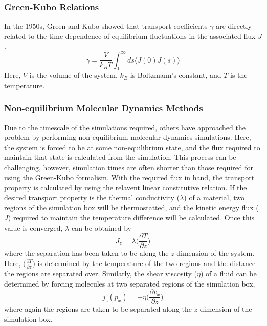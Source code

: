 \subsubsection{Green-Kubo Relations}
In the 1950s, Green and Kubo showed that transport coefficients
$\gamma$ are directly related to the time dependence of equilibrium
fluctuations in the associated flux $J$.
\begin{equation}\label{eq:greenKubo}
\gamma = \frac{V}{k_BT}\int_0^{\infty}ds\langle J(0)J(s)\rangle
\end{equation}
Here, $V$ is the volume of the system, $k_B$ is Boltzmann's constant,
and $T$ is the temperature.

\subsubsection{Non-equilibrium Molecular Dynamics Methods}
Due to the timescale of the simulations required, others have
approached the problem by performing non-equilibrium molecular
dynamics simulations. Here, the system is forced to be at some
non-equilibrium state, and the flux required to maintain that state is
calculated from the simulation. This process can be challenging,
however, simulation times are often shorter than those required for
using the Green-Kubo formalism. With the required flux in hand, the
transport property is calculated by using the relavent linear
constitutive relation. If the desired transport property is the
thermal conductivity ($\lambda$) of a material, two regions of the simulation box
will be thermostatted, and the kinetic energy flux ($J$) required to
maintain the temperature difference will be calculated. Once this
value is converged, $\lambda$ can be obtained by 
\begin{equation}\label{thermalTransport}
J_{z} = \lambda \big(\frac{\partial T}{\partial z}\big)
\end{equation}
where the separation has been taken to be along the $z$-dimension of
the system.  Here, $\big(\frac{\partial T}{\partial z}\big) $ is
determined by the temperature of the two regions and the distance the
regions are separated over. Similarly, the shear viscosity
($\eta$) of a fluid can be determined by forcing molecules at two
separated regions of the simulation box,
\begin{equation}\label{momentumTransport}
  j_{z}(p_{x}) = -\eta \big(\frac{\partial v_{x}}{\partial z}\big)
\end{equation}
where again the regions are taken to be separated along the
$z$-dimension of the simulation box.

